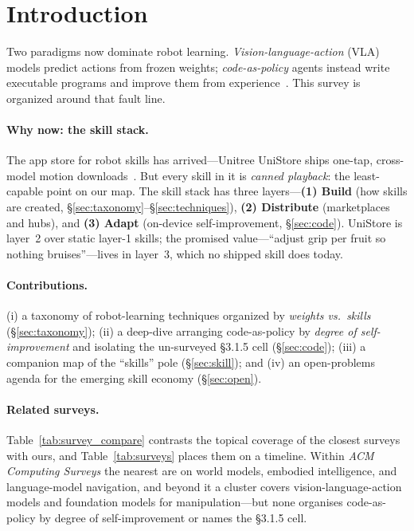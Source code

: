 \section{Introduction}
\label{sec:intro}

Two paradigms now dominate robot learning. \emph{Vision-language-action} (VLA)
models predict actions from frozen weights; \emph{code-as-policy} agents instead
write executable programs and improve them from experience~\citep{codeaspolicies,aspire}.
This survey is organized around that fault line.

\paragraph{Why now: the skill stack.}
The app store for robot skills has arrived---Unitree UniStore ships one-tap,
cross-model motion downloads~\citep{unistore2026}. But every skill in it is
\emph{canned playback}: the least-capable point on our map. The skill stack has
three layers---\textbf{(1) Build} (how skills are created, \S\ref{sec:taxonomy}--\S\ref{sec:techniques}),
\textbf{(2) Distribute} (marketplaces and hubs), and \textbf{(3) Adapt} (on-device
self-improvement, \S\ref{sec:code}). UniStore is layer~2 over static layer-1 skills;
the promised value---``adjust grip per fruit so nothing bruises''---lives in layer~3,
which no shipped skill does today.

\paragraph{Contributions.}
(i) a taxonomy of robot-learning techniques organized by \emph{weights vs.\ skills}
(\S\ref{sec:taxonomy}); (ii) a deep-dive arranging code-as-policy by \emph{degree of
self-improvement} and isolating the un-surveyed \S3.1.5 cell (\S\ref{sec:code});
(iii) a companion map of the ``skills'' pole (\S\ref{sec:skill}); and (iv) an
open-problems agenda for the emerging skill economy (\S\ref{sec:open}).

\paragraph{Related surveys.}
Table~\ref{tab:survey_compare} contrasts the topical coverage of the closest surveys with
ours, and Table~\ref{tab:surveys} places them on a timeline. Within \emph{ACM Computing
Surveys} the nearest are on world models, embodied intelligence, and language-model
navigation, and beyond it a cluster covers vision-language-action models and foundation models
for manipulation---but none organises code-as-policy by degree of self-improvement or names
the \S3.1.5 cell.


\FloatBarrier
